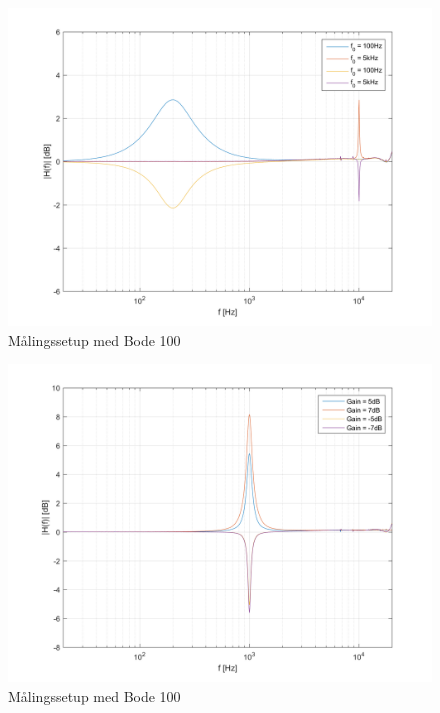 \begin{figure}[h!]\label{fig:Frekvensplacering_uden_hotfix}
	\centering
	\includegraphics[scale = 0.8]{billeder/Frekvensplacering_uden_hotfix}
	\caption{Målingssetup med Bode 100}
\end{figure}

\begin{figure}[h!]\label{fig:Gain_med_hotfix}
	\centering
	\includegraphics[scale = 0.8]{billeder/Gain_Med_hotfix}
	\caption{Målingssetup med Bode 100}
\end{figure}

